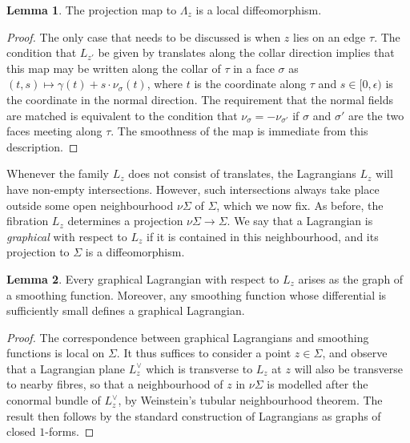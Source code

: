 \documentclass[11pt]{article}
\theoremstyle{definition}
\newtheorem{lemma}{Lemma}
\begin{document}
 \begin{lemma}
The projection map to $\Lambda_z$ is a local diffeomorphism.
 \end{lemma}
 \begin{proof}
The only case that needs to be discussed is when $z$ lies on an edge $\tau$. The condition that $L_{z'}$ be given by translates along the collar direction implies that this map may be written along the collar of $\tau$ in a face $\sigma$ as $(t,s) \mapsto \gamma(t) + s \cdot \nu_{\sigma}(t)$, where $t$ is the coordinate along $\tau$ and $s \in [0,\epsilon)$ is the coordinate in the normal direction. The requirement that the normal fields are matched is equivalent to the condition that $\nu_{\sigma} = - \nu_{\sigma'} $ if $\sigma$ and $\sigma'$ are the two faces meeting  along $\tau$. The smoothness of the map is immediate from this description.
 \end{proof}
 
 
 Whenever the family $L_z$ does not consist of translates, the Lagrangians $L_z$ will have non-empty intersections. However, such intersections always take place outside some open neighbourhood $\nu \Sigma$ of $\Sigma$, which we now fix. As before, the fibration $L_z$ determines a projection $\nu \Sigma \to \Sigma$.  We say that a Lagrangian is \emph{graphical} with respect to $L_{z}$ if it is contained in this neighbourhood, and its projection to $\Sigma$ is a diffeomorphism. 
 \begin{lemma} \label{lem:graphical_Lagrangians_local}
   Every graphical Lagrangian with respect to $L_{z}$ arises as the graph of a smoothing function. Moreover, any smoothing function whose differential is sufficiently small defines a graphical Lagrangian.
  \end{lemma}
  \begin{proof}
The correspondence between graphical Lagrangians and smoothing functions is local on $\Sigma$. It thus suffices to consider a point $z \in \Sigma$, and observe that a Lagrangian plane $L^\vee_z$ which is transverse to $L_z$ at $z$ will also be transverse to nearby fibres, so that a neighbourhood of $z$ in $\nu \Sigma$ is modelled after the conormal bundle of $L^\vee_z$, by Weinstein's tubular neighbourhood theorem. The result then follows by the standard construction of Lagrangians as graphs of closed $1$-forms.
  \end{proof}
\end{document}

